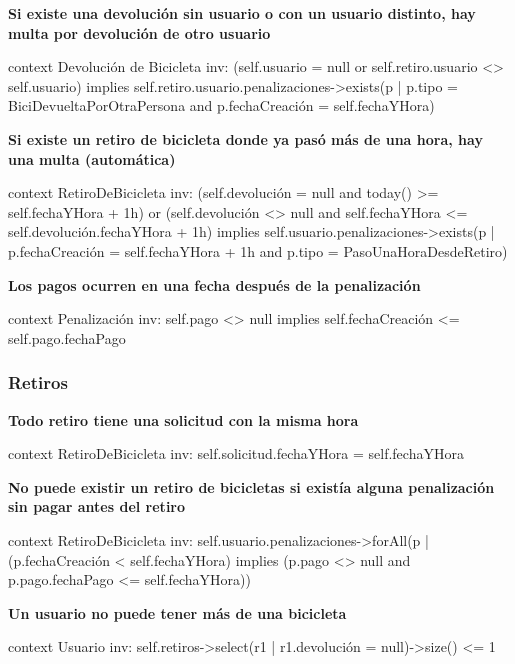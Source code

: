 \documentclass[a4paper, 10pt, twoside]{article}
\newenvironment{ocl}[1]
  {
    \textbf{#1}
    \verbatim
  }{
    \endverbatim
  }
\begin{document}
\begin{ocl}{Si existe una devolución sin usuario o con un usuario distinto, hay multa por devolución de otro usuario}
  context Devolución de Bicicleta
  inv: (self.usuario = null or self.retiro.usuario <> self.usuario) implies
           self.retiro.usuario.penalizaciones->exists(p |
               p.tipo = BiciDevueltaPorOtraPersona and p.fechaCreación = self.fechaYHora)
\end{ocl}

\begin{ocl}{Si existe un retiro de bicicleta donde ya pasó más de una hora, hay una multa (automática)}
  context RetiroDeBicicleta
  inv: (self.devolución = null and today() >= self.fechaYHora + 1h) or
       (self.devolución <> null and self.fechaYHora <= self.devolución.fechaYHora + 1h) implies
           self.usuario.penalizaciones->exists(p |
               p.fechaCreación = self.fechaYHora + 1h and
               p.tipo = PasoUnaHoraDesdeRetiro)
\end{ocl}

\begin{ocl}{Los pagos ocurren en una fecha después de la penalización}
  context Penalización
  inv: self.pago <> null implies self.fechaCreación <= self.pago.fechaPago
\end{ocl}


\subsubsection{Retiros}

\begin{ocl}{Todo retiro tiene una solicitud con la misma hora}
  context RetiroDeBicicleta
  inv: self.solicitud.fechaYHora = self.fechaYHora
\end{ocl}

\begin{ocl}{No puede existir un retiro de bicicletas si existía alguna penalización sin pagar antes del retiro}
  context RetiroDeBicicleta
  inv: self.usuario.penalizaciones->forAll(p |
           (p.fechaCreación < self.fechaYHora) implies
               (p.pago <> null and
               p.pago.fechaPago <= self.fechaYHora))
\end{ocl}

\begin{ocl}{Un usuario no puede tener más de una bicicleta}
  context Usuario
  inv: self.retiros->select(r1 | r1.devolución = null)->size() <= 1
\end{ocl}
\end{document}
